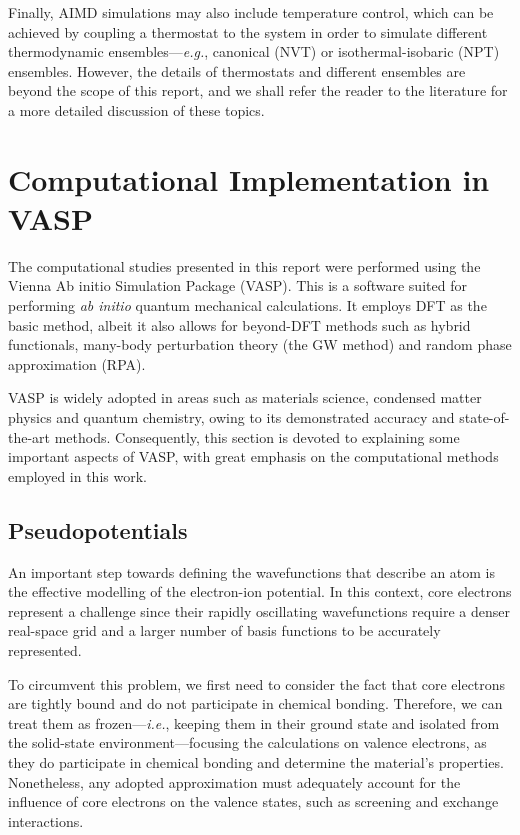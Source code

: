 Finally, AIMD simulations may also include temperature control, 
which can be achieved by coupling a thermostat to the system in order 
to simulate different thermodynamic ensembles---\emph{e.g.}, canonical (NVT) or isothermal-isobaric (NPT) ensembles.
However, the details of thermostats and different ensembles are beyond the scope
of this report, and we shall refer the reader to the literature\supercite{tuckerman2023statistical,frenkel2023understanding} for a more 
detailed discussion of these topics.

\section{Computational Implementation in VASP}
The computational studies presented in this report were performed using the 
Vienna Ab initio Simulation Package (VASP). This is a software suited for performing 
\emph{ab initio} quantum mechanical calculations\supercite{https://doi.org/10.1002/jcc.21057}. It employs DFT as the basic 
method, albeit it also allows for beyond-DFT methods such as hybrid functionals, 
many-body perturbation theory (the GW method) and random phase approximation (RPA). 

VASP is widely adopted in areas such as materials science, condensed matter physics and quantum chemistry, 
owing to its demonstrated accuracy and state-of-the-art methods. Consequently, 
this section is devoted to explaining some important aspects of VASP, with great 
emphasis on the computational methods employed in this work. 

\subsection{Pseudopotentials}
An important step towards defining the wavefunctions that describe an atom 
is the effective modelling of the electron-ion potential. In this context, core electrons
represent a challenge since their rapidly oscillating wavefunctions require 
a denser real-space grid and a larger number of basis functions 
to be accurately represented.

To circumvent this problem, we first need to consider the fact that core electrons 
are tightly bound and do not participate in chemical bonding. Therefore, we can 
treat them as frozen---\emph{i.e.}, keeping them in their ground state and isolated 
from the solid-state environment---focusing the calculations on valence electrons, 
as they do participate in chemical bonding and determine the material's properties.
Nonetheless, any adopted approximation must adequately account for the influence of core electrons 
on the valence states, such as screening and exchange interactions.

